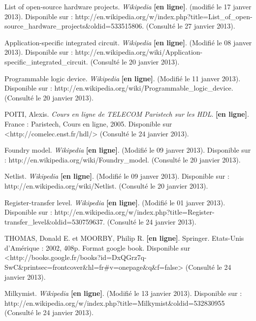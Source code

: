 List of open-source hardware projects. \textit{Wikipedia} \textbf{[en ligne]}. (modifié le 17 janver 2013). Disponible sur : http://en.wikipedia.org/w/index.php?title=List\_of\_open-source\_hardware\_projects\&oldid=533515806. (Consulté le 27 janvier 2013).



Application-specific integrated circuit. \textit{Wikipedia} \textbf{[en ligne]}. (Modifié le 08 janver 2013). Disponible sur : http://en.wikipedia.org/wiki/Application-specific\_integrated\_circuit. (Consulté le 20 janvier 2013).

Programmable logic device. \textit{Wikipedia} \textbf{[en ligne]}. (Modifié le 11 janver 2013). Disponible sur : http://en.wikipedia.org/wiki/Programmable\_logic\_device. (Consulté le 20 janvier 2013).

POITI, Alexis. \textit{Cours en ligne de {TELECOM} Paristech sur les {HDL}}. \textbf{[en ligne]}. France : Paristech, Cours en ligne, 2005. Disponible sur <http://comelec.enst.fr/hdl/> (Consulté le 24 janvier 2013).

Foundry model. \textit{Wikipedia} \textbf{[en ligne]}. (Modifié le 09 janver 2013). Disponible sur : http://en.wikipedia.org/wiki/Foundry\_model. (Consulté le 20 janvier 2013).

Netlist. \textit{Wikipedia} \textbf{[en ligne]}. (Modifié le 09 janver 2013). Disponible sur : http://en.wikipedia.org/wiki/Netlist. (Consulté le 20 janvier 2013).


Register-transfer level. \textit{Wikipedia} \textbf{[en ligne]}. (Modifié le 01 janver 2013). Disponible sur : http://en.wikipedia.org/w/index.php?title=Register-transfer\_level\&oldid=530759637. (Consulté le 24 janvier 2013).

THOMAS, Donald E. et MOORBY, Philip R.  \textbf{[en ligne]}. Springer. Etats-Unis d'Amérique : 2002, 408p. Format google book. Disponible sur <http://books.google.fr/books?id=DxQGrz7q-SwC\&printsec=frontcover\&hl=fr#v=onepage\&q\&f=false> (Consulté le 24 janvier 2013).

Milkymist. \textit{Wikipedia} \textbf{[en ligne]}. (Modifié le 13 janvier 2013). Disponible sur : http://en.wikipedia.org/w/index.php?title=Milkymist\&oldid=532830955 (Consulté le 24 janvier 2013).

